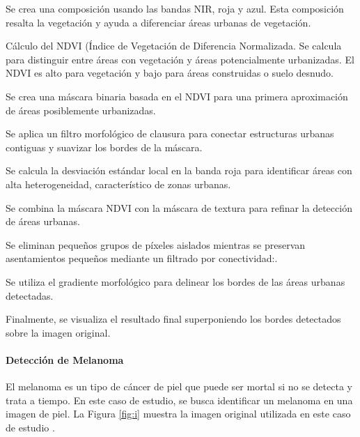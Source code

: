 \begin{seriate}


    \item Se crea una composición usando las bandas NIR, roja y azul. Esta composición resalta la vegetación y ayuda a diferenciar áreas urbanas de vegetación.
    
    \item Cálculo del NDVI (Índice de Vegetación de Diferencia Normalizada. Se calcula para distinguir entre áreas con vegetación y áreas potencialmente urbanizadas. El NDVI es alto para vegetación y bajo para áreas construidas o suelo desnudo.
    
    \item Se crea una máscara binaria basada en el NDVI para una primera aproximación de áreas posiblemente urbanizadas.
    
    \item Se aplica un filtro morfológico de clausura para conectar estructuras urbanas contiguas y suavizar los bordes de la máscara.
    
    \item Se calcula la desviación estándar local en la banda roja para identificar áreas con alta heterogeneidad, característico de zonas urbanas.
    
    \item Se combina la máscara NDVI con la máscara de textura para refinar la detección de áreas urbanas.
    
    \item Se eliminan pequeños grupos de píxeles aislados mientras se preservan asentamientos pequeños mediante un filtrado por conectividad:.
    
    \item Se utiliza el gradiente morfológico para delinear los bordes de las áreas urbanas detectadas.
    
    \item Finalmente, se visualiza el resultado final superponiendo los bordes detectados sobre la imagen original.
    
    \end{seriate}



\paragraph{Detección de Melanoma} El melanoma es un tipo de cáncer de piel que puede ser mortal si no se detecta y trata a tiempo. En este caso de estudio, se busca identificar un melanoma en una imagen de piel. La Figura \ref{fig:i} muestra la imagen original utilizada en este caso de estudio \autocite{ISICInternationalSkin}.

